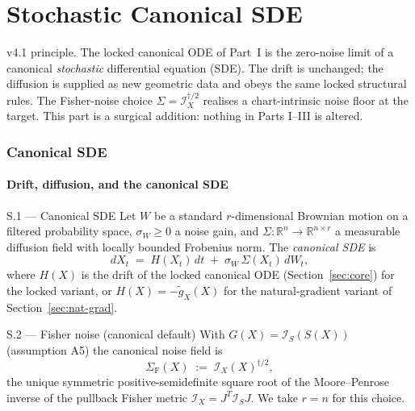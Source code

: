 \documentclass[11pt,oneside]{amsart}
\def\textbf#1{#1}%
\theoremstyle{plain}
\theoremstyle{definition}
\newcommand{\gX}{g_X}
\newcommand{\R}{\mathbb{R}}
\begin{document}

\part{Stochastic Canonical SDE}
\label{sec:part-iv}

\begin{lockbox}
\textbf{v4.1 principle.} The locked canonical ODE of Part~I is the
zero-noise limit of a canonical \emph{stochastic} differential
equation (SDE). The drift is unchanged; the diffusion is supplied as
new geometric data and obeys the same locked structural rules. The
Fisher-noise choice $\Sigma=\mathcal{I}_X^{\dagger/2}$ realises a
chart-intrinsic noise floor at the target. This part is a surgical
addition: nothing in Parts I--III is altered.
\end{lockbox}

\section{Canonical SDE}
\label{sec:sde}

\subsection{Drift, diffusion, and the canonical SDE}

\begin{defbox}{S.1 --- Canonical SDE}
Let $W$ be a standard $r$-dimensional Brownian motion on a filtered
probability space, $\sigma_W\ge 0$ a noise gain, and
$\Sigma : \R^n \to \R^{n\times r}$ a measurable diffusion field with
locally bounded Frobenius norm. The \emph{canonical SDE} is
\[
\boxed{\;
  dX_t \;=\; H(X_t)\,dt \;+\; \sigma_W\,\Sigma(X_t)\,dW_t,
\;}
\]
where $H(X)$ is the drift of the locked canonical ODE
(Section~\ref{sec:core}) for the locked variant, or $H(X)=-\widetilde\gX(X)$
for the natural-gradient variant of Section~\ref{sec:nat-grad}.
\end{defbox}

\begin{defbox}{S.2 --- Fisher noise (canonical default)}
With $G(X)=\mathcal{I}_S(S(X))$ (assumption A5) the canonical noise
field is
\[
\boxed{\;
  \Sigma_{\mathrm F}(X) \;:=\; \mathcal{I}_X(X)^{\dagger/2},
\;}
\]
the unique symmetric positive-semidefinite square root of the
Moore--Penrose inverse of the pullback Fisher metric
$\mathcal{I}_X = J^T \mathcal{I}_S J$. We take $r=n$ for this choice.
\end{defbox}
\end{document}
